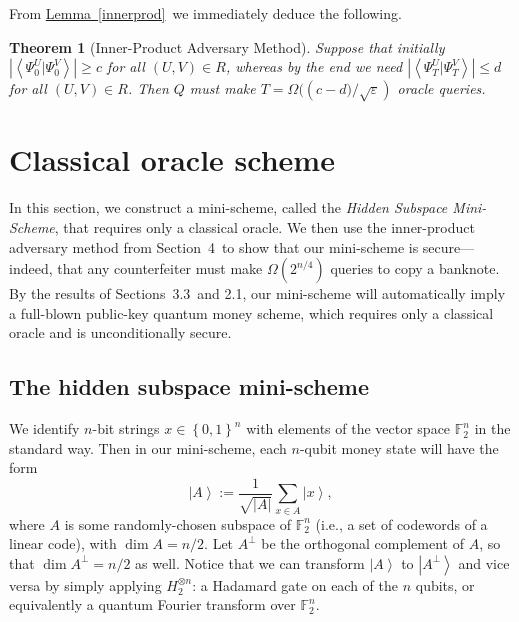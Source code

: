 \documentclass[10pt]{article}
\newtheorem{theorem}{Theorem}[section]
\theoremstyle{definition}
\numberwithin{equation}{section}
\newcommand{\expref}[2]{\texorpdfstring{\hyperref[#2]{#1~\ref{#2}}}{#1~\ref{#2}}}
\begin{document}
{}From \expref{Lemma}{innerprod}\ we immediately deduce the following.

\begin{theorem}
[Inner-Product Adversary Method]\label{lbthm}Suppose that initially
$\left\vert \left\langle \Psi_{0}^{U}|\Psi_{0}^{V}\right\rangle \right\vert
\geq c$ for all $\left(  U,V\right)  \in R$, whereas by the end we need
$\left\vert \left\langle \Psi_{T}^{U}|\Psi_{T}^{V}\right\rangle \right\vert
\leq d$ for all $\left(  U,V\right)  \in R$. Then $Q$ must make
$T=\Omega(({c-d)}/{\sqrt{\varepsilon}})  $ oracle queries.
\end{theorem}
\setcounter{section}{4}
\section{Classical oracle scheme\label{COR}}

In this section, we construct a mini-scheme, called the \emph{Hidden
Subspace Mini-Scheme}, that requires only a classical oracle. We then use
the inner-product adversary method from Section~4\ to show that our
mini-scheme is secure---indeed, that any counterfeiter must make
$\Omega\left(  2^{n/4}\right)  $ queries to copy a banknote. By the results
of Sections~3.3\ and 2.1, our mini-scheme will
automatically imply a full-blown public-key quantum money scheme, which
requires only a classical oracle and is unconditionally secure.

\subsection{The hidden subspace mini-scheme\label{HSM}}

We identify $n$-bit strings $x\in\left\{  0,1\right\}  ^{n}$ with elements of
the vector space $\mathbb{F}_{2}^{n}$ in the standard way. Then in our
mini-scheme, each $n$-qubit money state will have the form%
\[
\left\vert A\right\rangle :=\frac{1}{\sqrt{\left\vert A\right\vert }}%
\sum_{x\in A}\left\vert x\right\rangle ,
\]
where $A$ is some randomly-chosen subspace of $\mathbb{F}_{2}^{n}$ (i.e., a
set of codewords of a linear code), with $\dim A=n/2$. Let $A^{\bot}$ be
the orthogonal complement of $A$, so that $\dim A^{\bot}=n/2$ as
well. Notice that we can transform $\left\vert A\right\rangle $ to
$\left\vert A^{\bot}\right\rangle $ and vice versa by simply applying
$H_{2}^{\otimes n}$: a Hadamard gate on each of the $n$ qubits, or
equivalently a quantum Fourier transform over $\mathbb{F}_{2}^{n}$.
\end{document}
